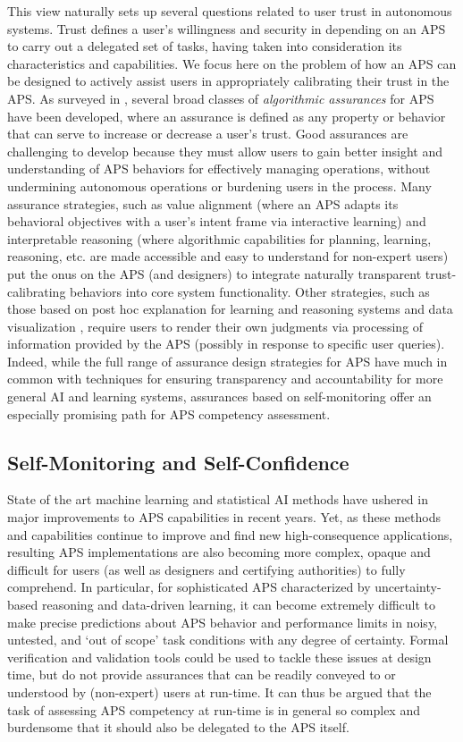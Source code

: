 This view naturally sets up several questions related to user trust in autonomous systems. Trust defines a user's willingness and security in depending on an APS to carry out a delegated set of tasks, having taken into consideration its characteristics and capabilities. 
We focus here on the problem of how an APS can be designed to actively assist users in appropriately calibrating their trust in the APS. As surveyed in \cite{Israelsen2017-ym}, several broad classes of \emph{algorithmic assurances} for APS have been developed, where an assurance is defined as any property or behavior that can serve to increase or decrease a user's trust. 
Good assurances are challenging to develop because they must allow users to gain better insight and understanding of APS behaviors for effectively managing operations, without undermining autonomous operations or burdening users in the process. 
Many assurance strategies, such as value alignment \cite{Dragan2014-gu} (where an APS adapts its behavioral objectives with a user's intent frame via interactive learning) and interpretable reasoning \cite{Ruping2006-xj} (where algorithmic capabilities for planning, learning, reasoning, etc. are made accessible and easy to understand for non-expert users) put the onus on the APS (and designers) to integrate naturally transparent trust-calibrating behaviors into core system functionality. 
Other strategies, such as those based on post hoc explanation for learning and reasoning systems \cite{Lacave2004-gq,Ribeiro2016-uc} and data visualization \cite{Sacha2017-hf}, require users to render their own judgments via processing of information provided by the APS (possibly in response to specific user queries). 
Indeed, while the full range of assurance design strategies for APS have much in common with techniques for ensuring transparency and accountability for more general AI and learning systems, assurances based on self-monitoring offer an especially promising path for APS competency assessment. 

\subsection{Self-Monitoring and Self-Confidence}
State of the art machine learning and statistical AI methods have ushered in major improvements to APS capabilities in recent years. 
Yet, as these methods and capabilities continue to improve and find new high-consequence applications, resulting APS implementations are also becoming more complex, opaque and difficult for users (as well as designers and certifying authorities) to fully comprehend. 
In particular, for sophisticated APS characterized by uncertainty-based reasoning and data-driven learning, it can become extremely difficult to make precise predictions about APS behavior and performance limits in noisy, untested, and `out of scope' task conditions with any degree of certainty. Formal verification and validation tools could be used to tackle these issues at design time, but do not provide assurances that can be readily conveyed to or understood by (non-expert) users at run-time. 
It can thus be argued that the task of assessing APS competency at run-time is in general so complex and burdensome that it should also be delegated to the APS itself. 

